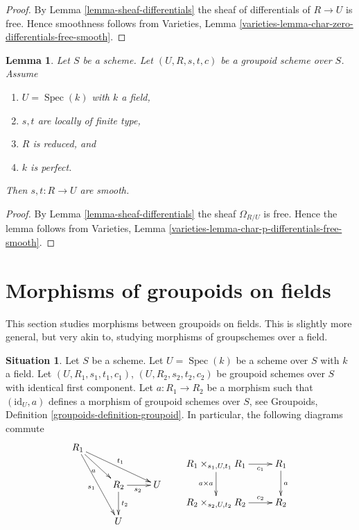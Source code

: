 \documentclass{stacks-project}
\theoremstyle{plain}
\newtheorem{lemma}[subsection]{Lemma}
\theoremstyle{definition}
\newtheorem{situation}[subsection]{Situation}
\theoremstyle{remark}
\numberwithin{equation}{subsection}
\def\Spec{\mathop{\mathrm{Spec}}}
\begin{document}
\begin{proof}
By
Lemma \ref{lemma-sheaf-differentials}
the sheaf of differentials of $R \to U$ is free.
Hence smoothness follows from
Varieties, Lemma \ref{varieties-lemma-char-zero-differentials-free-smooth}.
\end{proof}

\begin{lemma}
\label{lemma-reduced-group-scheme-perfect-field-characteristic-p-smooth}
Let $S$ be a scheme. Let $(U, R, s, t, c)$ be a groupoid scheme
over $S$. Assume
\begin{enumerate}
\item $U = \Spec(k)$ with $k$ a field,
\item $s, t$ are locally of finite type,
\item $R$ is reduced, and
\item $k$ is perfect.
\end{enumerate}
Then $s, t : R \to U$ are smooth.
\end{lemma}

\begin{proof}
By
Lemma \ref{lemma-sheaf-differentials}
the sheaf $\Omega_{R/U}$ is free. Hence the lemma follows from
Varieties, Lemma \ref{varieties-lemma-char-p-differentials-free-smooth}.
\end{proof}










\section{Morphisms of groupoids on fields}
\label{section-morphisms-groupoids-on-fields}

\noindent
This section studies morphisms between groupoids on fields.
This is slightly more general, but very akin to, studying
morphisms of groupschemes over a field.

\begin{situation}
\label{situation-morphism-groupoids-on-field}
Let $S$ be a scheme.
Let $U = \Spec(k)$ be a scheme over $S$ with $k$ a field.
Let $(U, R_1, s_1, t_1, c_1)$, $(U, R_2, s_2, t_2, c_2)$ be groupoid schemes
over $S$ with identical first component. Let $a : R_1 \to R_2$ be a morphism
such that $(\text{id}_U, a)$ defines a morphism of groupoid
schemes over $S$, see
Groupoids, Definition \ref{groupoids-definition-groupoid}.
In particular, the following diagrams commute
$$
\vcenter{
\xymatrix{
R_1 \ar[rrd]^{t_1} \ar[rdd]_{s_1} \ar[rd]_a \\
& R_2 \ar[d]^{t_2} \ar[r]_{s_2} & U \\
& U
}
}
\quad\quad
\vcenter{
\xymatrix{
R_1 \times_{s_1, U, t_1} R_1 \ar[r]_-{c_1} \ar[d]_{a \times a} &
R_1 \ar[d]^a \\
R_2 \times_{s_2, U, t_2} R_2 \ar[r]^-{c_2} &
R_2
}
}
$$
\end{situation}
\end{document}
